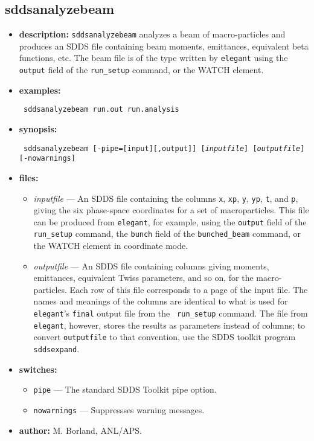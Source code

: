 \documentclass[11pt]{article}
\begin{document}
\subsection{sddsanalyzebeam}
\label{sddsanalyzebeam}

\begin{itemize}
\item {\bf description:} 
{\tt sddsanalyzebeam} analyzes a beam of macro-particles and produces an SDDS file
containing beam moments, emittances, equivalent beta functions, etc.  The beam file
is of the type written by {\tt elegant} using the {\tt output} field of the {\tt run\_setup}
command, or the WATCH element.

\item {\bf examples:}
\begin{flushleft}{\tt
sddsanalyzebeam run.out run.analysis 
}\end{flushleft}

\item {\bf synopsis:}
\begin{flushleft}{\tt
sddsanalyzebeam [-pipe=[input][,output]] [{\em inputfile}] [{\em outputfile}]
[-nowarnings]
}\end{flushleft}

\item {\bf files:}
\begin{itemize}
\item {\em inputfile} --- An SDDS file containing the columns {\tt x}, {\tt xp}, {\tt y},
{\tt yp}, {\tt t}, and {\tt p}, giving the six phase-space coordinates for a set of macroparticles.
This file can be produced from {\tt elegant}, for example, using the {\tt output} field of the {\tt run\_setup} 
command, the {\tt bunch} field of the {\tt bunched\_beam} command, or the WATCH element in
coordinate mode.

\item {\em outputfile} --- An SDDS file containing columns giving
moments, emittances, equivalent Twiss parameters, and so on, for the
macro-particles.  Each row of this file corresponds to a page of the
input file.  The names and meanings of the columns are identical to
what is used for {\tt elegant}'s {\tt final} output file from the {\tt
run\_setup} command.  The file from {\tt elegant}, however, stores the
results as parameters instead of columns; to convert {\tt outputfile}
to that convention, use the SDDS toolkit program {\tt sddsexpand}.

\end{itemize}

\item {\bf switches:}
\begin{itemize}
\item {\tt pipe} --- The standard SDDS Toolkit pipe option.
\item {\tt nowarnings} --- Suppressses warning messages.
\end{itemize}

\item {\bf author:} M. Borland, ANL/APS.
\end{itemize}
\end{document}
